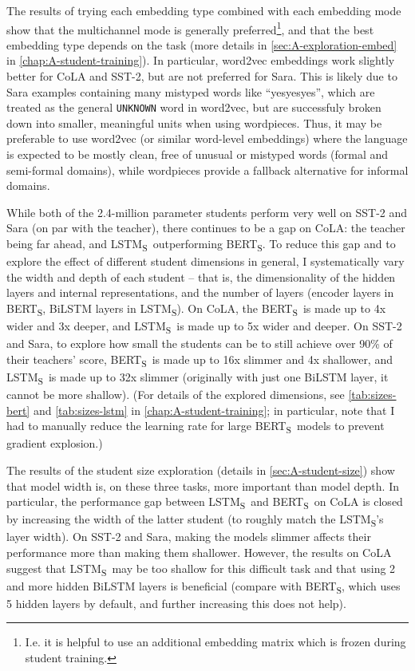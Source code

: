 \documentclass[bsc,frontabs,singlespacing,parskip,deptreport]{infthesis}
\def\BERTS{BERT\textsubscript{S}}
\def\LSTMS{LSTM\textsubscript{S}}
\begin{document}
{{    The results of trying each embedding type combined with each embedding mode show that the multichannel mode is generally preferred\footnote{I.e. it is helpful to use an additional embedding matrix which is frozen during student training.}, and that the best embedding type depends on the task (more details in \autoref{sec:A-exploration-embed} in \autoref{chap:A-student-training}). 
    In particular, word2vec embeddings work slightly better for CoLA and SST-2, but are not preferred for Sara. This is likely due to Sara examples containing many mistyped words like ``yesyesyes'', which are treated as the general \verb|UNKNOWN| word in word2vec, but are successfuly broken down into smaller, meaningful units when using wordpieces. Thus, it may be preferable to use word2vec (or similar word-level embeddings) where the language is expected to be mostly clean, free of unusual or mistyped words (formal and semi-formal domains), while wordpieces provide a fallback alternative for informal domains.

    While both of the 2.4-million parameter students perform very well on SST-2 and Sara (on par with the teacher), there continues to be a gap on CoLA: the teacher being far ahead, and \LSTMS~outperforming \BERTS.
    To reduce this gap and to explore the effect of different student dimensions in general, I systematically vary the width and depth of each student -- that is, the dimensionality of the hidden layers and internal representations, and the number of layers (encoder layers in \BERTS, BiLSTM layers in \LSTMS).
    On CoLA, the \BERTS~is made up to 4x wider and 3x deeper, and \LSTMS~is made up to 5x wider and deeper. On SST-2 and Sara, to explore how small the students can be to still achieve over 90\% of their teachers' score, \BERTS~is made up to 16x slimmer and 4x shallower, and \LSTMS~is made up to 32x slimmer (originally with just one BiLSTM layer, it cannot be more shallow). (For details of the explored dimensions, see \autoref{tab:sizes-bert} and \autoref{tab:sizes-lstm} in \autoref{chap:A-student-training}; in particular, note that I had to manually reduce the learning rate for large \BERTS~models to prevent gradient explosion.)

    The results of the student size exploration (details in \autoref{sec:A-student-size}) show that model width is, on these three tasks, more important than model depth. In particular, the performance gap between \LSTMS~and \BERTS~on CoLA is closed by increasing the width of the latter student (to roughly match the \LSTMS's layer width). On SST-2 and Sara, making the models slimmer affects their performance more than making them shallower. However, the results on CoLA suggest that \LSTMS~may be too shallow for this difficult task and that using 2 and more hidden BiLSTM layers is beneficial (compare with \BERTS, which uses 5 hidden layers by default, and further increasing this does not help).
  }

}
\end{document}
